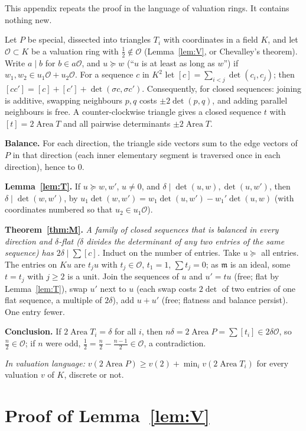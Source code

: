 \documentclass[11pt]{article}
\theoremstyle{definition}
\newcommand{\cO}{\mathcal{O}}
\newcommand{\m}{\mathfrak{m}}
\newcommand{\sg}{\sigma}
\newcommand{\Area}{\operatorname{Area}}
\newcommand{\ar}[1]{[#1]}
\begin{document}
This appendix repeats the proof in the language of valuation rings. It contains nothing new.

Let $P$ be special, dissected into triangles $T_i$ with coordinates in a field $K$, and let
$\cO\subset K$ be a valuation ring with $\tfrac12\notin\cO$ (Lemma~\ref{lem:V}, or Chevalley's
theorem). Write $a\mid b$ for $b\in a\cO$, and $u\succeq w$ (``$u$ is at least as long as $w$'') if
$w_1,w_2\in u_1\cO+u_2\cO$. For a sequence $c$ in $K^2$ let $\ar c=\sum_{i<j}\det(c_i,c_j)$; then
$\ar{cc'}=\ar c+\ar{c'}+\det(\sg c,\sg c')$. Consequently, for closed sequences: joining is additive,
swapping neighbours $p,q$ costs $\pm2\det(p,q)$, and adding parallel neighbours is free. A
counter-clockwise triangle gives a closed sequence $t$ with $\ar t=2\Area T$ and all pairwise
determinants $\pm2\Area T$.

\textbf{Balance.} For each direction, the triangle side vectors sum to the edge vectors of $P$ in
that direction (each inner elementary segment is traversed once in each direction), hence to $0$.

\textbf{Lemma~\ref{lem:T}.} If $u\succeq w,w'$, $u\ne0$, and $\delta\mid\det(u,w),\det(u,w')$, then
$\delta\mid\det(w,w')$, by $u_1\det(w,w')=w_1\det(u,w')-w_1'\det(u,w)$ (with coordinates numbered so
that $u_2\in u_1\cO$).

\textbf{Theorem~\ref{thm:M}.} \emph{A family of closed sequences that is balanced in every direction and
$\delta$-flat ($\delta$ divides the determinant of any two entries of the same sequence) has
$2\delta\mid\sum\ar c$.} Induct on the number of entries. Take $u\succeq$ all entries. The entries
on $Ku$ are $t_ju$ with $t_j\in\cO$, $t_1=1$, $\sum t_j=0$; as $\m$ is an ideal, some $t=t_j$ with
$j\ge2$ is a unit. Join the sequences of $u$ and $u'=tu$ (free; flat by Lemma~\ref{lem:T}), swap $u'$ next to
$u$ (each swap costs $2\det$ of two entries of one flat sequence, a multiple of $2\delta$), add
$u+u'$ (free; flatness and balance persist). One entry fewer.

\textbf{Conclusion.} If $2\Area T_i=\delta$ for all $i$, then
$n\delta=2\Area P=\sum\ar{t_i}\in2\delta\cO$, so $\tfrac n2\in\cO$; if $n$ were odd,
$\tfrac12=\tfrac n2-\tfrac{n-1}2\in\cO$, a contradiction.

\emph{In valuation language:} $v(2\Area P)\ge v(2)+\min_iv(2\Area T_i)$ for every valuation $v$ of
$K$, discrete or not.

\section{Proof of Lemma~\ref{lem:V}}\label{sec:proofV}
\end{document}
